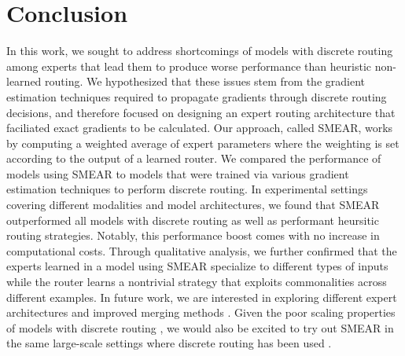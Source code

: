 \documentclass{article}
\theoremstyle{plain}
\theoremstyle{definition}
\theoremstyle{remark}
\begin{document}


\section{Conclusion}
\label{sec:conclusion}

In this work, we sought to address shortcomings of models with discrete routing among experts that lead them to produce worse performance than heuristic non-learned routing.
We hypothesized that these issues stem from the gradient estimation techniques required to propagate gradients through discrete routing decisions, and therefore focused on designing an expert routing architecture that faciliated exact gradients to be calculated.
Our approach, called SMEAR, works by computing a weighted average of expert parameters where the weighting is set according to the output of a learned router.
We compared the performance of models using SMEAR to models that were trained via various gradient estimation techniques to perform discrete routing.
In experimental settings covering different modalities and model architectures, we found that SMEAR outperformed all models with discrete routing as well as performant heursitic routing strategies.
Notably, this performance boost comes with no increase in computational costs.
Through qualitative analysis, we further confirmed that the experts learned in a model using SMEAR specialize to different types of inputs while the router learns a nontrivial strategy that exploits commonalities across different examples.
In future work, we are interested in exploring different expert architectures \citep{liu2022few,hu2021lora} and improved merging methods \citep{matena2021merging,ainsworth2022git,jin2022dataless}.
Given the poor scaling properties of models with discrete routing \citep{clark2022unified}, we would also be excited to try out SMEAR in the same large-scale settings where discrete routing has been used \citep{fedus2021switch,zoph2022designing,du2022glam}.
\end{document}
